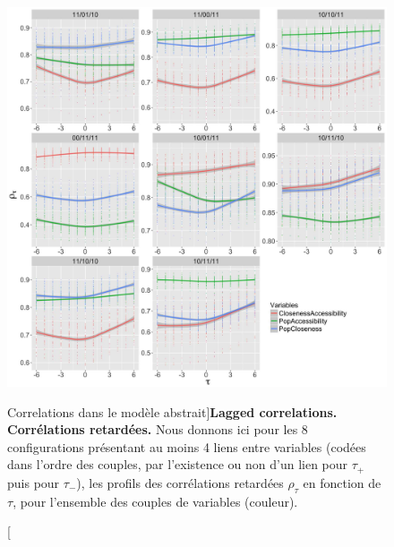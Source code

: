 \begin{figure}
	\includegraphics[width=\linewidth]{Figures/Final/6-2-2-fig-macrocoevol-correlations.jpg}
\caption[Correlations in the abstract model][Correlations dans le modèle abstrait]{\textbf{Lagged correlations.} \label{fig:macrocoevol:correlations}}{\textbf{Corrélations retardées.} Nous donnons ici pour les 8 configurations présentant au moins 4 liens entre variables (codées dans l'ordre des couples, par l'existence ou non d'un lien pour $\tau_+$ puis pour $\tau_-$), les profils des corrélations retardées $\rho_{\tau}$ en fonction de $\tau$, pour l'ensemble des couples de variables (couleur).\label{fig:macrocoevol:correlations}}
\end{figure}




